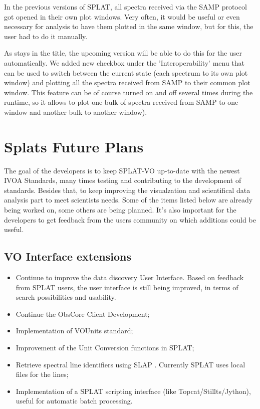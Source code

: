 \documentclass[final,authoryear,5p,times,twocolumn]{elsarticle}
\begin{document}
In the previous versions of SPLAT, all spectra received via the SAMP
protocol got opened in their own plot windows. Very often, it would be
useful or even necessary for analysis to have them plotted in the same
window, but for this, the user had to do it manually.

As stays in the title, the upcoming version will be able to do this
for the user automatically. We added new checkbox under the
'Interoperability' menu that can be used to switch between the current
state (each spectrum to its own plot window) and plotting all the
spectra received from SAMP to their common plot window. This feature
can be of course turned on and off several times during the runtime,
so it allows to plot one bulk of spectra received from SAMP to one
window and another bulk to another window).

\section{Splats Future Plans}

The goal of the developers is to keep SPLAT-VO up-to-date with the
newest IVOA Standards, many times testing and contributing to the
development of standards. Besides that, to keep improving the
visualzation and scientifical data analysis part to meet scientists
needs.  Some of the items listed below are already being worked on,
some others are being planned. It's also important for the developers
to get feedback from the users community on which additions could be
useful.

\subsection{VO Interface extensions}
\begin{itemize}
\item Continue to improve the data discovery User Interface.
Based on feedback from SPLAT users, the user interface is still being
improved, in terms of search possibilities and usability.
\item Continue the ObsCore Client Development;
\item Implementation of  VOUnits \citep{vounits} standard;
\item	Improvement of the Unit Conversion functions in SPLAT;
\item Retrieve spectral line identifiers using SLAP \citep[Simple Line
  Access Protocol;][]{slap}. Currently SPLAT uses local files for the
  lines;
\item Implementation of a SPLAT scripting interface (like Topcat/Stillts/Jython), 
useful for automatic batch processing.
\end{itemize}
\end{document}
